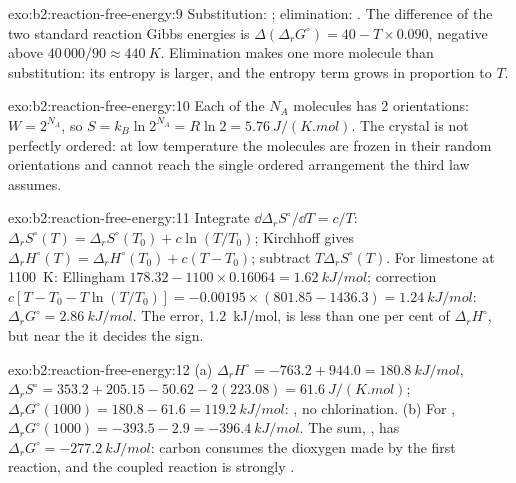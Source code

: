 \begin{solution}{exo:b2:reaction-free-energy:9}
Substitution: ; elimination:
. The difference of the two
standard reaction Gibbs energies is $\Delta(\Delta_r G^\circ) = 40 - T \times
0.090$, negative above $40\,000/90 \approx \qty{440}{K}$. Elimination makes
one more molecule than substitution: its entropy is larger, and the entropy
term grows in proportion to $T$.
\end{solution}

\begin{solution}{exo:b2:reaction-free-energy:10}
Each of the $N_A$ molecules has 2 orientations: $W = 2^{N_A}$, so $S =
k_B\ln 2^{N_A} = R\ln 2 = \qty{5.76}{J/(K.mol)}$. The crystal is not
perfectly ordered: at low temperature the molecules are frozen in their
random orientations and cannot reach the single ordered arrangement the third
law assumes.
\end{solution}

\begin{solution}{exo:b2:reaction-free-energy:11}
Integrate $\dd\Delta_r S^\circ/\dd T = c/T$: $\Delta_r S^\circ(T) = \Delta_r
S^\circ(T_0) + c\ln(T/T_0)$; Kirchhoff gives $\Delta_r H^\circ(T) = \Delta_r
H^\circ(T_0) + c(T - T_0)$; subtract $T\Delta_r S^\circ(T)$. For limestone at
\qty{1100}{K}: Ellingham $178.32 - 1100 \times 0.16064 = \qty{1.62}{kJ/mol}$;
correction $c[T - T_0 - T\ln(T/T_0)] = -0.00195 \times (801.85 - 1436.3) =
\qty{+1.24}{kJ/mol}$: $\Delta_r G^\circ = \qty{2.86}{kJ/mol}$. The error,
\qty{1.2}{kJ/mol}, is less than one per cent of $\Delta_r H^\circ$, but near
the  it decides the sign.
\end{solution}

\begin{solution}{exo:b2:reaction-free-energy:12}
(a) $\Delta_r H^\circ = -763.2 + 944.0 = \qty{+180.8}{kJ/mol}$, $\Delta_r
S^\circ = 353.2 + 205.15 - 50.62 - 2(223.08) = \qty{+61.6}{J/(K.mol)}$;
$\Delta_r G^\circ(1000) = 180.8 - 61.6 = \qty{+119.2}{kJ/mol}$: ,
no chlorination. (b) For , $\Delta_r G^\circ(1000) =
-393.5 - 2.9 = \qty{-396.4}{kJ/mol}$. The sum, , has $\Delta_r G^\circ = \qty{-277.2}{kJ/mol}$: carbon
consumes the dioxygen made by the first reaction, and the coupled reaction is
strongly .
\end{solution}


